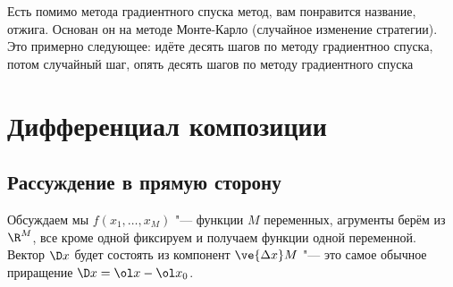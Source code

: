 \documentclass[a4paper,10pt,twoside]{article}
\let\AVsection\section{}
\renewcommand\section{\newpage\scol\AVsection}
\newcommand{\scol}{  \renewcommand{\headrulewidth}{0.5pt}\fancyhead[RE,LO]{\thesection{} \leftmark} \fancyhead[LE,RO]{\thepage}}
\begin{document}
	 Есть помимо метода градиентного спуска метод, вам понравится название, отжига. Основан он на методе Монте-Карло (случайное изменение стратегии).
	 Это примерно следующее: идёте десять шагов по методу градиентноо спуска, потом случайный шаг, опять десять шагов по методу градиентного спуска\ldotst 
	 \section{Дифференциал композиции}
	 \subsection{Рассуждение в прямую сторону}
	 Обсуждаем мы $f(x_1,\ldots,x_M)$ "--- функции $M$ переменных, агрументы берём из $\R^M$, все кроме одной фиксируем и получаем
	 функции одной переменной. Вектор $\D x$ будет состоять из компонент $\ve{\Delta x}M$ "--- это самое обычное приращение $\D x = \ol x - \ol x_0$.
	 
\end{document}
